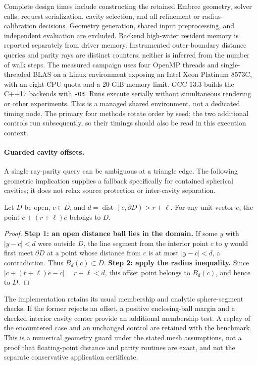 Complete design times include constructing the retained Embree geometry,
solver calls, request serialization, cavity selection, and all refinement or
radius-calibration decisions. Geometry generation, shared input preprocessing,
and independent evaluation are excluded. Backend high-water resident memory is
reported separately from driver memory. Instrumented outer-boundary distance
queries and parity rays are distinct counters; neither is inferred from the
number of walk steps. The measured campaign uses four OpenMP threads and single-threaded BLAS on
a Linux environment exposing an Intel Xeon Platinum 8573C, with an eight-CPU
quota and a 20 GiB memory limit. GCC 13.3 builds the C++17 backends with
\texttt{-O3}. Runs execute
serially without simultaneous rendering or other experiments. This is a
managed shared environment, not a dedicated timing node. The primary four
methods rotate order by seed; the two additional controls run subsequently,
so their timings should also be read in this execution context.

\paragraph{Guarded cavity offsets.}
A single ray-parity query can be ambiguous at a triangle edge. The following
geometric implication supplies a fallback specifically for contained spherical
cavities; it does not relax source protection or inter-cavity separation.

\begin{lemma}
Let $D$ be open, $c\in D$, and $d=\operatorname{dist}(c,\partial D)>r+\ell$.
For any unit vector $e$, the point $c+(r+\ell)e$ belongs to $D$.
\end{lemma}
\begin{proof}
\textbf{Step 1: an open distance ball lies in the domain.}
If some $y$ with $|y-c|<d$ were outside $D$, the line segment from the
interior point $c$ to $y$ would first meet $\partial D$ at a point whose
distance from $c$ is at most $|y-c|<d$, a contradiction.
Thus $B_d(c)\subset D$.
\textbf{Step 2: apply the radius inequality.}
Since $|c+(r+\ell)e-c|=r+\ell<d$, this offset point belongs to $B_d(c)$,
and hence to $D$.
\end{proof}

The implementation retains its usual membership and analytic sphere-segment
checks. If the former rejects an offset, a positive enclosing-ball margin and
a checked interior cavity center provide an additional membership test. A
replay of the encountered case and an unchanged control are retained with
the benchmark. This is a numerical geometry guard under the stated mesh
assumptions, not a proof that floating-point distance and parity routines
are exact, and not the separate conservative application certificate.

